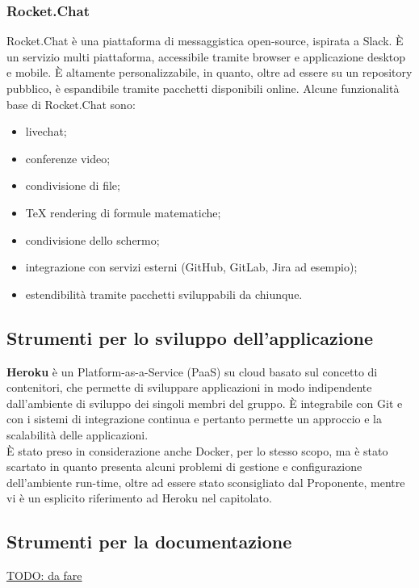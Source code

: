 \subsubsection{Rocket.Chat}
Rocket.Chat è una piattaforma di messaggistica open-source, ispirata a Slack. È un servizio multi piattaforma, accessibile tramite browser e applicazione desktop e mobile. È altamente personalizzabile, in quanto, oltre ad essere su un repository pubblico, è espandibile tramite pacchetti disponibili online. Alcune funzionalità base di Rocket.Chat sono:
\begin{itemize}
	\item livechat;
	\item conferenze video;
	\item condivisione di file;
	\item TeX rendering di formule matematiche;
	\item condivisione dello schermo;
	\item integrazione con servizi esterni (GitHub, GitLab, Jira ad esempio);
	\item estendibilità tramite pacchetti sviluppabili da chiunque.
\end{itemize}

\subsection{Strumenti per lo sviluppo dell'applicazione}
\textbf{Heroku} è un Platform-as-a-Service (PaaS) su cloud basato sul concetto di contenitori, che permette di sviluppare applicazioni in modo indipendente dall'ambiente di sviluppo dei singoli membri del gruppo. È integrabile con Git e con i sistemi di integrazione continua e pertanto permette un approccio  e la scalabilità delle applicazioni.\\
È stato preso in considerazione anche Docker, per lo stesso scopo, ma è stato scartato in quanto presenta alcuni problemi di gestione e configurazione dell'ambiente run-time, oltre ad essere stato sconsigliato dal Proponente, mentre vi è un esplicito riferimento ad Heroku nel capitolato.

\subsection{Strumenti per la documentazione}
\underline{TODO: da fare}

